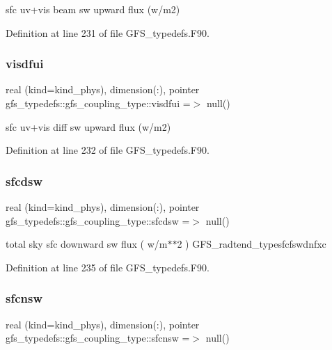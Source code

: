 sfc uv+vis beam sw upward flux (w/m2) 



Definition at line 231 of file G\+F\+S\+\_\+typedefs.\+F90.

\mbox{\label{structgfs__typedefs_1_1gfs__coupling__type_a04c2fd4c7659503fb14550422322349f}} 
\subsubsection{visdfui}
{\footnotesize\ttfamily real (kind=kind\+\_\+phys), dimension(\+:), pointer gfs\+\_\+typedefs\+::gfs\+\_\+coupling\+\_\+type\+::visdfui =$>$ null()}



sfc uv+vis diff sw upward flux (w/m2) 



Definition at line 232 of file G\+F\+S\+\_\+typedefs.\+F90.

\mbox{\label{structgfs__typedefs_1_1gfs__coupling__type_a82bb20f696e3f9218e861e44447e25d1}} 
\subsubsection{sfcdsw}
{\footnotesize\ttfamily real (kind=kind\+\_\+phys), dimension(\+:), pointer gfs\+\_\+typedefs\+::gfs\+\_\+coupling\+\_\+type\+::sfcdsw =$>$ null()}



total sky sfc downward sw flux ( w/m$\ast$$\ast$2 ) G\+F\+S\+\_\+radtend\+\_\+typesfcfswdnfxc 



Definition at line 235 of file G\+F\+S\+\_\+typedefs.\+F90.

\mbox{\label{structgfs__typedefs_1_1gfs__coupling__type_ac86e3f1e872103addc5585fef5e1590b}} 
\subsubsection{sfcnsw}
{\footnotesize\ttfamily real (kind=kind\+\_\+phys), dimension(\+:), pointer gfs\+\_\+typedefs\+::gfs\+\_\+coupling\+\_\+type\+::sfcnsw =$>$ null()}



